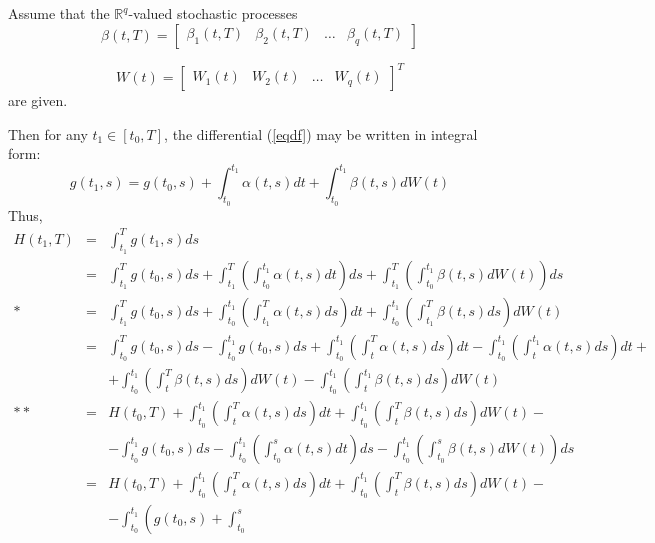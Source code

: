 \begin{demo} 
Assume that the $\mathbb{R}^q$-valued stochastic processes 
$$
\beta(t,T) = [\begin{array}{cccc}
\beta_1(t,T) & \beta_2(t,T) & \dots & \beta_q(t,T)
\end{array}] 
$$

$$
W(t) = [\begin{array}{cccc}
W_1(t) & W_2(t) & \dots & W_q(t) 
\end{array}]^T
$$
are given.

Then for any $t_1 \in [t_0,T]$, the differential (\ref{eqdf}) may be
written in integral form:
\begin{equation}
\label{eqft0t1}
g(t_1,s)=g(t_0,s)+\int_{t_0}^{t_1} \alpha(t,s) dt+\int_{t_0}^{t_1}
\beta(t,s) dW(t)
\end{equation}
Thus,
$$
\begin{array}{ccl}
H(t_1,T) & = & \int_{t_1}^T g(t_1,s) ds\\
         & = & \int_{t_1}^T g(t_0,s) ds + \int_{t_1}^T
         \left(\int_{t_0}^{t_1} \alpha(t,s) dt\right) ds +
         \int_{t_1}^T \left(\int_{t_0}^{t_1} \beta(t,s) dW(t)\right)
         ds\\ 
      *  & = &\int_{t_1}^T g(t_0,s) ds +
         \int_{t_0}^{t_1}\left(\int_{t_1}^T \alpha(t,s) ds\right) dt + 
          \int_{t_0}^{t_1}\left(\int_{t_1}^T \beta(t,s)
         ds\right)dW(t) \\  
         & = &\int_{t_0}^T g(t_0,s) ds- \int_{t_0}^{t_1} g(t_0,s) ds +
         \int_{t_0}^{t_1}\left(\int_t^T \alpha(t,s) ds\right) dt -
         \int_{t_0}^{t_1}\left(\int_t^{t_1} \alpha(t,s) ds\right) dt + \\
         &   & +  \int_{t_0}^{t_1}\left(\int_t^T \beta(t,s) ds\right)dW(t)-
         \int_{t_0}^{t_1}\left(\int_t^{t_1} \beta(t,s) ds\right)dW(t)
         \\  
      **  & = & H(t_0,T) + \int_{t_0}^{t_1}\left(\int_t^T \alpha(t,s) ds\right) dt + \int_{t_0}^{t_1}\left(\int_t^T \beta(t,s) ds\right)dW(t)  - \\ 
         &   & - \int_{t_0}^{t_1} g(t_0,s) ds -
         \int_{t_0}^{t_1}\left(\int_{t_0}^s  \alpha(t,s) dt\right) ds
         - \int_{t_0}^{t_1}\left(\int_{t_0}^s \beta(t,s) dW(t)\right)
         ds\\
         & = & H(t_0,T) + \int_{t_0}^{t_1}\left(\int_t^T \alpha(t,s) ds\right) dt + \int_{t_0}^{t_1}\left(\int_t^T \beta(t,s) ds\right)dW(t)  - \\ 
         &   & - \int_{t_0}^{t_1} \left(g(t_0,s) + \int_{t_0}^s

\end{array}$$
\end{demo}
